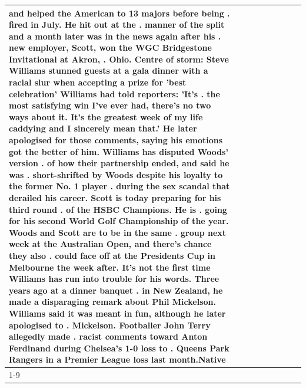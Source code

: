 \begin{table}[H]
\begin{tabular}{lllrlllll}
and helped the American to 13 majors before being . fired in July. He hit out at the . manner of the split and a month later was in the news again after his . new employer, Scott, won the WGC Bridgestone Invitational at Akron, . Ohio. Centre of storm: Steve Williams stunned guests at a gala dinner with a racial slur when accepting a prize for 'best celebration' Williams had told reporters: 'It's . the most satisfying win I've ever had, there's no two ways about it. It's the greatest week of my life caddying and I sincerely mean that.' He later apologised for those comments, saying his emotions got the better of him. Williams has disputed Woods' version . of how their partnership ended, and said he was . short-shrifted by Woods despite his loyalty to the former No. 1 player . during the sex scandal that derailed his career. Scott is today preparing for his third round . of the HSBC Champions. He is . going for his second World Golf Championship of the year. Woods and Scott are to be in the same . group next week at the Australian Open, and there's chance they also . could face off at the Presidents Cup in Melbourne the week after. It's not the first time Williams has run into trouble for his words. Three years ago at a dinner banquet . in New Zealand, he made a disparaging remark about Phil Mickelson. Williams said it was meant in fun, although he later apologised to . Mickelson. Footballer John Terry allegedly made . racist comments toward Anton Ferdinand during Chelsea's 1-0 loss to . Queens Park Rangers in a Premier League loss last month.Native \\
\cline{1-9}

\end{tabular}
\end{table}
